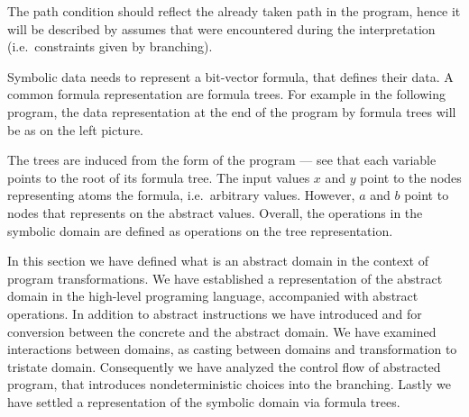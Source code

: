 The path condition should reflect the already taken path in the program, hence
it will be described by assumes that were encountered during the interpretation
(i.e.~constraints given by branching).

Symbolic data needs to represent a bit-vector formula, that defines their data.
A common formula representation are formula trees. For example in the following
program, the data representation at the end of the program by formula trees will
be as on the left picture.

\bigskip
\noindent
{}
\hfill
{}

The trees are induced from the \SSA form of the program --- see that each
variable points to the root of its formula tree. The input values $x$ and $y$
point to the nodes representing atoms the formula, i.e.~arbitrary values.
However, $a$ and $b$ point to nodes that represents on the abstract values.
Overall, the operations in the symbolic domain are defined as operations on
the tree representation.

\begin{summary}
In this section we have defined what is an abstract domain in the context of program
transformations. We have established a representation of the abstract domain in
the high-level programing language, accompanied with abstract operations. In
addition to abstract \LLVM instructions we have introduced  and
 for conversion between the concrete and the abstract domain. We have
examined interactions between domains, as casting between domains and
transformation to tristate domain. Consequently we have analyzed the control flow
of abstracted program, that introduces nondeterministic choices into the
branching. Lastly we have settled a representation of the symbolic domain via formula
trees.
\end{summary}

